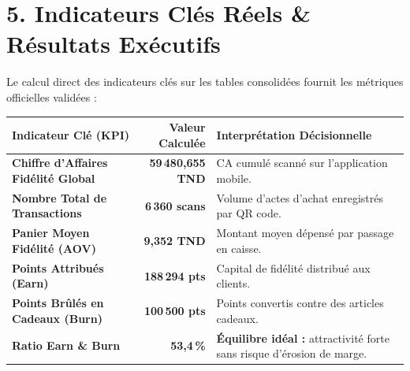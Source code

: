 \documentclass[11pt,a4paper]{article}
\begin{document}
\begin{center}
\end{center}

\vspace{0.4cm}

\section*{\textcolor{fidnessblue}{5. Indicateurs Clés Réels \& Résultats Exécutifs}}

Le calcul direct des indicateurs clés sur les tables consolidées fournit les métriques officielles validées :

\vspace{0.15cm}
\noindent
\begin{tabularx}{\textwidth}{p{6.5cm} r X}
\toprule
\rowcolor{tableheader}
\textbf{Indicateur Clé (KPI)} & \textbf{Valeur Calculée} & \textbf{Interprétation Décisionnelle} \\
\midrule
\textbf{Chiffre d'Affaires Fidélité Global} & \textbf{59\,480,655 TND} & CA cumulé scanné sur l'application mobile. \\
\textbf{Nombre Total de Transactions} & \textbf{6\,360 scans} & Volume d'actes d'achat enregistrés par QR code. \\
\textbf{Panier Moyen Fidélité (AOV)} & \textbf{9,352 TND} & Montant moyen dépensé par passage en caisse. \\
\textbf{Points Attribués (Earn)} & \textbf{188\,294 pts} & Capital de fidélité distribué aux clients. \\
\textbf{Points Brûlés en Cadeaux (Burn)} & \textbf{100\,500 pts} & Points convertis contre des articles cadeaux. \\
\textbf{Ratio Earn \& Burn} & \textbf{53,4\,\%} & \textbf{Équilibre idéal :} attractivité forte sans risque d'érosion de marge. \\
\bottomrule
\end{tabularx}
\end{document}

